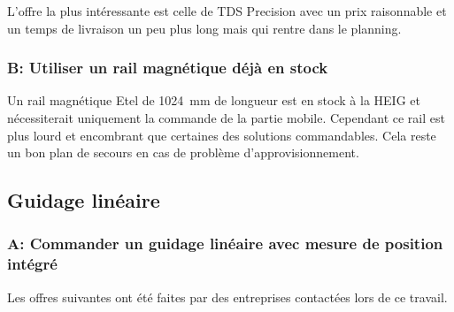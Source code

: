 \begin{table}[H]
    \centering
    \caption{Offres pour le moteur linéaire}
    \label{tab:OffreMot}
\end{table}

L'offre la plus intéressante est celle de TDS Precision avec un prix raisonnable et un temps de livraison un peu plus long mais qui rentre dans le planning.

\subsubsection{B: Utiliser un rail magnétique déjà en stock}
Un rail magnétique Etel de 1024~mm de longueur est en stock à la HEIG et nécessiterait uniquement la commande de la partie mobile. Cependant ce
rail est plus lourd et encombrant que certaines des solutions commandables. Cela reste un bon plan de secours en cas de problème d'approvisionnement.

\subsection{Guidage linéaire}
\subsubsection{A: Commander un guidage linéaire avec mesure de position intégré}
Les offres suivantes ont été faites par des entreprises contactées lors de ce travail.


